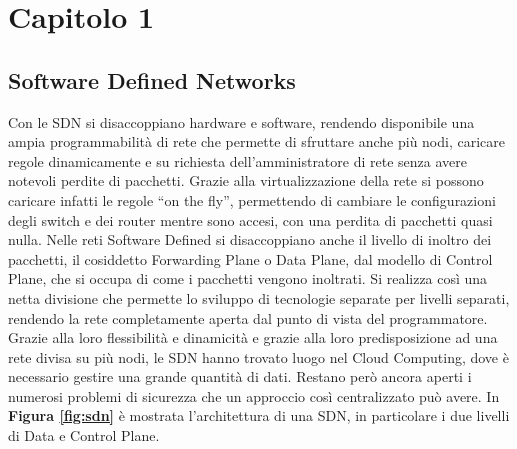 \chapter*{Capitolo 1}



\section*{Software Defined Networks}
Con le SDN si disaccoppiano hardware e software, rendendo disponibile una ampia programmabilità di rete che permette di sfruttare anche più nodi, caricare regole dinamicamente e su richiesta dell'amministratore di rete senza avere notevoli perdite di pacchetti. Grazie alla virtualizzazione della rete si possono caricare infatti le regole ``on the fly'', permettendo di cambiare le configurazioni degli switch e dei router mentre sono accesi, con una perdita di pacchetti quasi nulla.
Nelle reti Software Defined si disaccoppiano anche il livello di inoltro dei pacchetti, il cosiddetto Forwarding Plane o Data Plane, dal modello di Control Plane, che si occupa di come i pacchetti vengono inoltrati.
Si realizza così una netta divisione che permette lo sviluppo di tecnologie separate per livelli separati, rendendo la rete completamente aperta dal punto di vista del programmatore.\\
Grazie alla loro flessibilità e dinamicità e grazie alla loro predisposizione ad una rete divisa su più nodi, le SDN hanno trovato luogo nel Cloud Computing, dove è necessario gestire una grande quantità di dati. Restano però ancora aperti i numerosi problemi di sicurezza che un approccio così centralizzato può avere. In {\textbf{Figura \ref{fig:sdn}}} è mostrata l'architettura di una SDN, in particolare i due livelli di Data e Control Plane. \cite{noauthor_software_nodate}
\vspace{1cm}
\FloatBarrier
